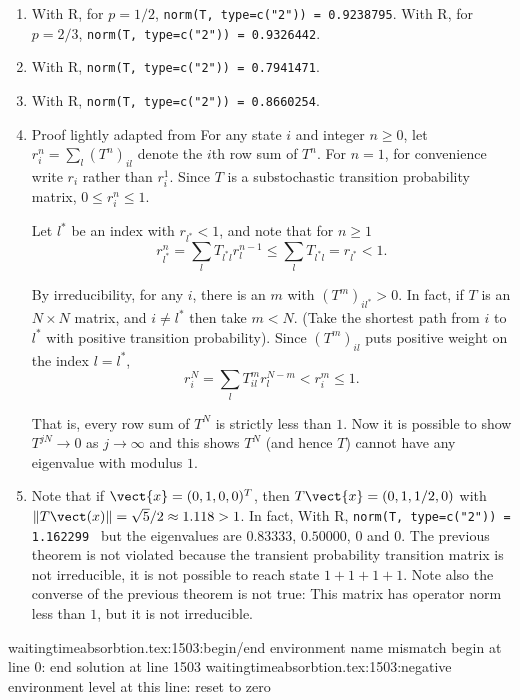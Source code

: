 \documentclass[12pt]{article}
\begin{document}
\begin{solution}
    \begin{enumerate}[label=(\alph*)]
    \item
        With R, for \( p=1/2 \), \texttt{norm(T, type=c("2")) =
        0.9238795}.  With R, for \( p=2/3 \), \texttt{norm(T, type=c("2"))
        = 0.9326442}.
    \item
        With R, \texttt{norm(T, type=c("2")) = 0.7941471}.
    \item
        With R, \texttt{norm(T, type=c("2")) = 0.8660254}.
    \item
        Proof lightly adapted from 
        For any state \( i \) and integer \( n \ge 0 \), let \( r_i^n =
        \sum_{l}(T^n)_{il} \) denote the \( i \)th row sum of \( T^n \).
        For \( n=1 \), for convenience write \( r_i \) rather than \( r_i^1
        \).  Since \( T \) is a substochastic transition probability
        matrix, \( 0 \le r_i^n \le 1 \).

        Let \( l^{\ast} \) be an index with \( r_{l^{\ast}} < 1 \), and
        note that for \( n \ge 1 \)
        \[
            r_{l^{\ast}}^n = \sum_{l} T_{l^{\ast}l} r_l^{n-1} \le \sum_{l}
            T_{l^{\ast}l} = r_{l^{\ast}} < 1.
        \]

        By irreducibility, for any \( i \), there is an \( m \) with \(
        (T^m)_{il^{\ast}}>0 \).  In fact, if \( T \) is an \( N \times N
        \) matrix, and \( i \ne l^{\ast} \) then take \( m<N \).  (Take
        the shortest path from \( i \) to \( l^{\ast} \) with positive
        transition probability).  Since \( (T^{m})_{il} \) puts positive
        weight on the index \( l=l^{\ast} \),
        \[
            r_i^N = \sum_{l} T_{il}^{m} r_l^{N-m} < r_i^m \le 1.
        \]

        That is, every row sum of \( T^N \) is strictly less than \( 1 \).
        Now it is possible to show \( T^{jN} \to 0 \) as \( j \to \infty
        \) and this shows \( T^N \) (and hence \( T \)) cannot have any
        eigenvalue with modulus \( 1 \).
    \item
        Note that if \( \vect{x} = (0,1,0,0)^T \), then \( T\vect{x} = (0,1,1/2,0)
        \) with \( \| T\vect(x)\| = \sqrt{5}/2 \approx 1.118 > 1 \).  In
        fact, With R, \texttt{norm(T, type=c("2")) = 1.162299 } but the
        eigenvalues are \( 0.83333 \), \( 0.50000 \), \( 0 \) and \( 0 \).
        The previous theorem is not violated because the transient
        probability transition matrix is not irreducible, it is not
        possible to reach state \( 1+1+1+1 \).  Note also the converse
        of the previous theorem is not true:  This matrix has operator
        norm less than \( 1 \), but it is not irreducible.
\end{enumerate}
waitingtimeabsorbtion.tex:1503:begin/end environment name mismatch
	begin {} at line 0: end {solution} at line 1503
waitingtimeabsorbtion.tex:1503:negative environment level at this line: reset to zero
\end{solution}
\end{document}
